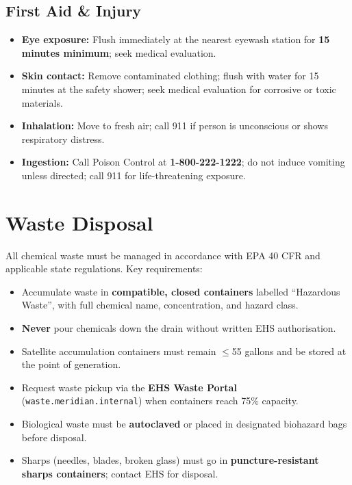 \documentclass[11pt,a4paper]{article}
\begin{document}
\subsection{First Aid \& Injury}
\begin{itemize}[noitemsep, topsep=2pt, leftmargin=1.4em]
  \item \textbf{Eye exposure:} Flush immediately at the nearest eyewash station for \textbf{15 minutes minimum}; seek medical evaluation.
  \item \textbf{Skin contact:} Remove contaminated clothing; flush with water for 15 minutes at the safety shower; seek medical evaluation for corrosive or toxic materials.
  \item \textbf{Inhalation:} Move to fresh air; call 911 if person is unconscious or shows respiratory distress.
  \item \textbf{Ingestion:} Call Poison Control at \textbf{1-800-222-1222}; do not induce vomiting unless directed; call 911 for life-threatening exposure.
\end{itemize}

\section{Waste Disposal}

All chemical waste must be managed in accordance with EPA 40 CFR and applicable state
regulations. Key requirements:

\begin{itemize}[noitemsep, topsep=2pt, leftmargin=1.4em]
  \item Accumulate waste in \textbf{compatible, closed containers} labelled ``Hazardous Waste'',
    with full chemical name, concentration, and hazard class.
  \item \textbf{Never} pour chemicals down the drain without written EHS authorisation.
  \item Satellite accumulation containers must remain $\leq$55 gallons and be stored at the point of generation.
  \item Request waste pickup via the \textbf{EHS Waste Portal} (\texttt{waste.meridian.internal}) when containers reach 75\% capacity.
  \item Biological waste must be \textbf{autoclaved} or placed in designated biohazard bags before disposal.
  \item Sharps (needles, blades, broken glass) must go in \textbf{puncture-resistant sharps containers}; contact EHS for disposal.
\end{itemize}
\end{document}
